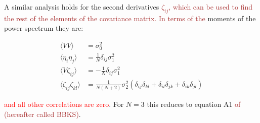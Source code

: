 \documentclass[12pt]{article}
\newcommand{\SH}[1]{\textcolor{brown}{[{\bf SH}: #1]}}
\newcommand{\sh}[1]{\textcolor{brown}{#1}}
\newcommand{\LFL}[1]{\textcolor{red}{#1}}
\begin{document}
A similar analysis holds for the second derivatives \sh{$\zeta_{ij}$}\sh{, which can be used to find the rest of the elements of the covariance matrix. In terms of the} moments of the power spectrum they are:


\begin{equation} \label{corr}
\begin{split}
\langle VV \rangle &= \sigma_0^2 \\
\langle\eta_i\eta_j\rangle &= \frac{1}{N}\delta_{ij}\sigma_1^2 \\
\langle V\zeta_{ij}\rangle &= -\frac{1}{N}\delta_{ij}\sigma_1^2 \\
\langle\zeta_{ij}\zeta_{kl}\rangle &= \frac{1}{N(N+2)}\sigma_2^2(\delta_{ij}\delta_{kl}+\delta_{il}\delta_{jk}+\delta_{ik}\delta_{jl})
\end{split}
\end{equation}

\noindent \LFL{and all other correlations are zero}. For $N=3$ this reduces to equation A1 \sh{of \cite{BBKS} (hereafter called BBKS)}. 



\end{document}
